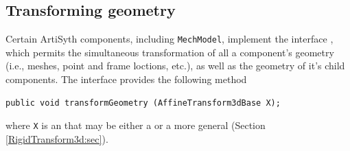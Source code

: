
%
%


\subsection{Transforming geometry}
\label{TransformingGeometry:sec}

Certain ArtiSyth components, including {\tt MechModel}, implement the
interface ,
which permits the simultaneous transformation of all a component's
geometry (i.e., meshes, point and frame loctions, etc.), as well as
the geometry of it's child components. The interface provides the
following method
%
\begin{lstlisting}[]
   public void transformGeometry (AffineTransform3dBase X);
\end{lstlisting}
%
where {\tt X} is an 
that may be either a  or a
more general  (Section
\ref{RigidTransform3d:sec}).

